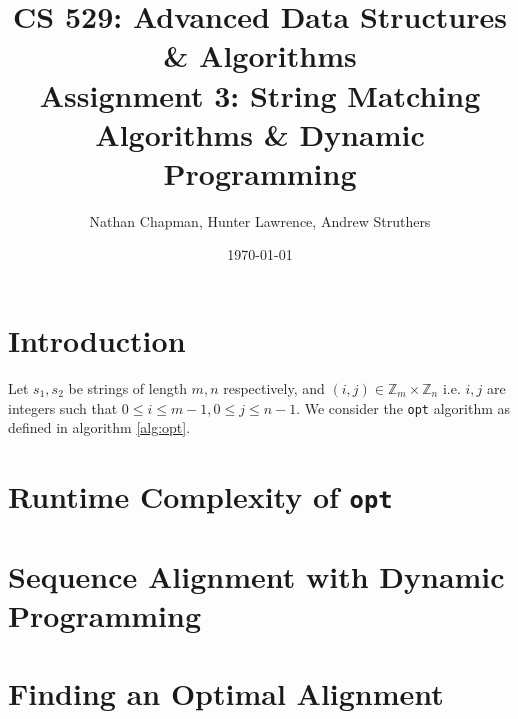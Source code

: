 \documentclass{article}
\title{\vspace*{-0.625in}CS 529: Advanced Data Structures \& Algorithms \\ Assignment 3: String Matching Algorithms \& Dynamic Programming}
\author{Nathan Chapman, Hunter Lawrence, Andrew Struthers}
\date{\today}
\newcommand{\integer}{\textbf{int} }
\begin{document}
    \maketitle

    \section*{Introduction}

        Let $s_1, s_2$ be strings of length $m, n$ respectively, and $(i, j) \in \mathbb{Z}_m \times \mathbb{Z}_n$ i.e. $i, j$ are integers such that $0 \leq i \leq m - 1, 0 \leq j \leq n - 1$.  We consider the \texttt{opt} algorithm as defined in algorithm \ref{alg:opt}.

        \begin{function}
            \caption{opt(\integer $i$, \integer $j$)}
            \label{alg:opt}
            
        \end{function}
    \section*{Runtime Complexity of \texttt{opt}}

    \section*{Sequence Alignment with Dynamic Programming}

    \section*{Finding an Optimal Alignment}

    \printbibliography
\end{document}
